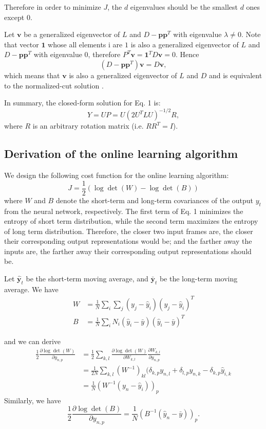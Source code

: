 \documentclass{article}
\begin{document}
Therefore in order to minimize $J$, the $d$ eigenvalues should be the smallest
 $d$ ones except $0$.

Let $\mathbf{v}$ be a generalized eigenvector of $L$ and $D-\mathbf{pp}^T$ with
eigenvalue $\lambda \neq 0$. Note that vector $\mathbf{1}$ whose all elements i
are $1$ is also a generalized eigenvector of $L$ and $D-\mathbf{pp}^T$ with 
eigenvalue $0$, therefore $P^T\mathbf{v} = \mathbf{1}^TD\mathbf{v} = 0$. Hence
\begin{equation}
(D-\mathbf{pp}^T)\mathbf{v} = D\mathbf{v},
\end{equation} 
which means that $\mathbf{v}$ is also a generalized eigenvector of $L$ and $D$ and
 is equivalent to the normalized-cut solution \cite{Shi00}.

In summary, the closed-form solution for Eq. 1 is:
\begin{equation}
Y = UP = U(2U^TLU)^{-1/2}R,
\end{equation}
where $R$ is an arbitrary rotation matrix (i.e. $RR^T = I$).

\subsection{Derivation of the online learning algorithm}
We design the following cost function for the online learning algorithm:
\begin{equation}
J = \frac{1}{2}(\log\det(W) - \log\det(B))
\end{equation}
where $W$ and $B$ denote the short-term and long-term covariances of the output
$y_t$ from the neural network, respectively. The first term of Eq. 1 minimizes 
the entropy of short term distribution, while the second term maximizes the 
entropy of long term distribution. Therefore, the closer two input frames are,
the closer their corresponding output representations would be; and the farther
away the inputs are, the farther away their corresponding output representations
 should be. 

Let $\hat{\mathbf{y}}_t$ be the short-term moving average, and 
$\bar{\mathbf{y}}_t$ be the long-term moving average. We have
\begin{align}
W &= \frac{1}{N}\sum_i\sum_j(y_j - \hat{y}_i)(y_j - \hat{y}_i)^T \\
B &= \frac{1}{N}\sum_iN_i(\hat{y}_i - \bar{y})(\hat{y}_i - \bar{y})^T
\end{align}

and we can derive
\begin{align}
\frac{1}{2}\frac{\partial \log\det(W)}{\partial y_{n,p}}
  &= \frac{1}{2}\sum_{k,l}\frac{\partial \log\det(W)}{\partial W_{k,l}}\frac{\partial W_{k,l}}{\partial y_{n,p}} \\
  &= \frac{1}{2N}\sum_{k,l}(W^{-1})_{kl}(\delta_{k,p}y_{n,l} + \delta_{l,p}y_{n,k} - \delta_{k,p}\hat{y}_{i,k} \\
  &= \frac{1}{N}(W^{-1}(y_n - \hat{y}_i))_p
\end{align}
Similarly, we have
\begin{equation}
\frac{1}{2}\frac{\partial \log\det(B)}{\partial y_{n,p}} = \frac{1}{N}(B^{-1}(\hat{y}_n - \bar{y}))_p.
\end{equation}
\end{document}
